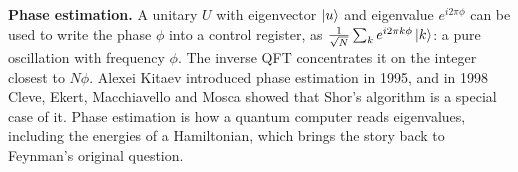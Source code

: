 \textbf{Phase estimation.} A unitary $U$ with eigenvector $\ket{u}$ and eigenvalue
$e^{i2\pi\phi}$ can be used to write the phase $\phi$ into a control register, as
$\frac{1}{\sqrt N}\sum_k e^{i2\pi k\phi}\ket k$: a pure oscillation with frequency
$\phi$. The inverse QFT concentrates it on the integer closest to $N\phi$. Alexei
Kitaev introduced phase estimation in 1995, and in 1998 Cleve, Ekert, Macchiavello
and Mosca showed that Shor's algorithm is a special case of it. Phase estimation is
how a quantum computer reads eigenvalues, including the energies of a Hamiltonian,
which brings the story back to Feynman's original question.
